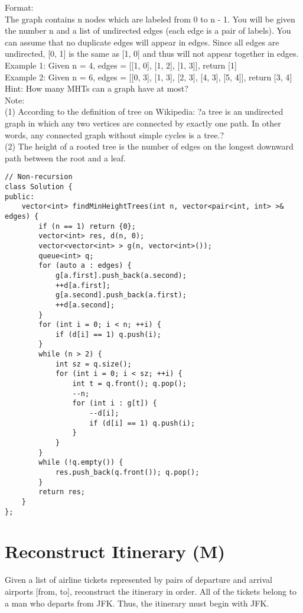 Format:\\
The graph contains n nodes which are labeled from 0 to n - 1. You will be given the number n and a list of undirected edges (each edge is a pair of labels). You can assume that no duplicate edges will appear in edges. Since all edges are undirected, [0, 1] is the same as [1, 0] and thus will not appear together in edges.\\

Example 1:
Given n = 4, edges = [[1, 0], [1, 2], [1, 3]], return [1]\\
Example 2:
Given n = 6, edges = [[0, 3], [1, 3], [2, 3], [4, 3], [5, 4]], return [3, 4]\\

Hint:
    How many MHTs can a graph have at most?\\
    
Note:\\
(1) According to the definition of tree on Wikipedia: ?a tree is an undirected graph in which any two vertices are connected by exactly one path. In other words, any connected graph without simple cycles is a tree.?\\
(2) The height of a rooted tree is the number of edges on the longest downward path between the root and a leaf. \\

\begin{lstlisting}
// Non-recursion
class Solution {
public:
    vector<int> findMinHeightTrees(int n, vector<pair<int, int> >& edges) {
        if (n == 1) return {0};
        vector<int> res, d(n, 0);
        vector<vector<int> > g(n, vector<int>());
        queue<int> q;
        for (auto a : edges) {
            g[a.first].push_back(a.second);
            ++d[a.first];
            g[a.second].push_back(a.first);
            ++d[a.second];
        }
        for (int i = 0; i < n; ++i) {
            if (d[i] == 1) q.push(i);
        }
        while (n > 2) {
            int sz = q.size();
            for (int i = 0; i < sz; ++i) {
                int t = q.front(); q.pop();
                --n;
                for (int i : g[t]) {
                    --d[i];
                    if (d[i] == 1) q.push(i);
                }
            }
        }
        while (!q.empty()) {
            res.push_back(q.front()); q.pop();
        }
        return res;
    }
};
\end{lstlisting}


\section{Reconstruct Itinerary (M)}
Given a list of airline tickets represented by pairs of departure and arrival airports [from, to], reconstruct the itinerary in order. All of the tickets belong to a man who departs from JFK. Thus, the itinerary must begin with JFK.\\

